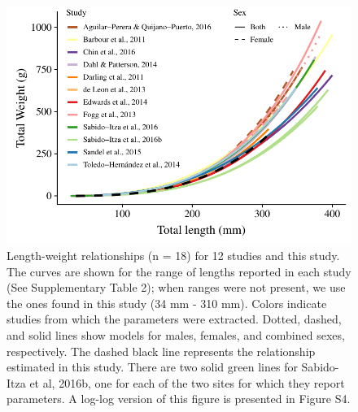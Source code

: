 \documentclass[fleqn,10pt,lineno]{wlpeerj} %
\begin{document}
\begin{figure}
\centering
\includegraphics{Manuscript_files/figure-latex/fit2-1.pdf}
\caption{\label{fig:all_allo}Length-weight relationships (n = 18) for 12
studies and this study. The curves are shown for the range of lengths
reported in each study (See Supplementary Table 2); when ranges were not
present, we use the ones found in this study (34 mm - 310 mm). Colors
indicate studies from which the parameters were extracted. Dotted,
dashed, and solid lines show models for males, females, and combined
sexes, respectively. The dashed black line represents the relationship
estimated in this study. There are two solid green lines for Sabido-Itza
et al, 2016b, one for each of the two sites for which they report
parameters. A log-log version of this figure is presented in Figure S4.}
\end{figure}
\end{document}
